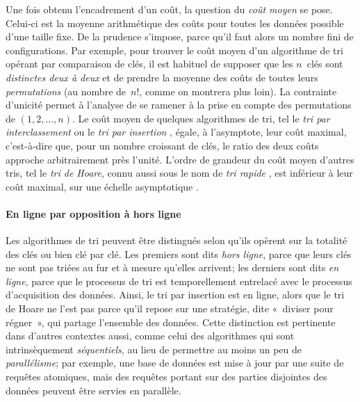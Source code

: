 Une fois obtenu l'encadrement d'un coût, la question du \emph{coût
  moyen} \citep{VitterFlajolet_1990} \citep[\S{}1.2.10]{Knuth_1997} se
pose. Celui-ci est la moyenne arithmétique des coûts pour toutes les
données possible d'une taille fixe. De la prudence s'impose, parce
qu'il faut alors un nombre fini de configurations. Par exemple, pour
trouver le coût moyen d'un algorithme de tri opérant par comparaison
de clés, il est habituel de supposer que les \(n\)~clés sont
\emph{distinctes deux à deux} et de prendre la
moyenne des coûts de toutes leurs
\emph{permutations} (au nombre de~\(n!\), comme on
montrera plus loin). La contrainte d'unicité permet à l'analyse de se
ramener à la prise en compte des permutations de \((1,2,\dots,n)\). Le
coût moyen de quelques algorithmes de tri, tel le \emph{tri par
  interclassement} \cite[\S{}5.2.4]{Knuth_1998}
\cite[\S{}2.3]{CLRS_2009} ou le \emph{tri par insertion}
\cite[\S{}5.2.1]{Knuth_1998} \cite[\S{}2.1]{CLRS_2009}, égale, à
l'asymptote, leur coût maximal, c'est-à-dire que, pour un nombre
croissant de clés, le ratio des deux coûts approche arbitrairement
près l'unité. L'ordre de grandeur du
coût moyen d'autres tris, tel le \emph{tri de Hoare}, connu aussi sous
le nom de \emph{tri rapide} \cite[\S{}5.2.2]{Knuth_1998}
\cite[\S{}7]{CLRS_2009}, est inférieur à leur coût maximal, sur une
échelle asymptotique \cite[\S{}9]{GrahamKnuthPatashnik_1994}.

\paragraph{En ligne par opposition à hors ligne}
\label{par:online_vs_offline}

Les algorithmes de tri peuvent être distingués selon qu'ils opèrent
sur la totalité des clés ou bien clé par clé. Les premiers sont dits
\emph{hors ligne}, parce que leurs clés
ne sont pas triées au fur et à mesure qu'elles arrivent; les derniers
sont dits \emph{en ligne}, parce que le
processus de tri est temporellement entrelacé avec le processus
d'acquisition des données. Ainsi, le tri par insertion est en ligne,
alors que le tri de Hoare ne l'est pas parce qu'il repose sur une
stratégie, dite «~diviser pour régner~», qui partage l'ensemble des
données. Cette distinction est pertinente dans d'autres contextes
aussi, comme celui des algorithmes qui sont intrinsèquement
\emph{séquentiels}, au lieu de permettre au moins un peu de
\emph{parallélisme}; par exemple, une base de données est mise à jour
par une suite de requêtes atomiques, mais des requêtes portant sur des
parties disjointes des données peuvent être servies en parallèle.

